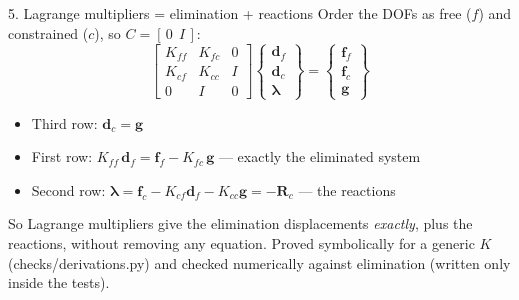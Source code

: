 \documentclass[aspectratio=169,10pt]{beamer}
\newcommand{\vd}{\mathbf d}
\newcommand{\vf}{\mathbf f}
\newcommand{\vg}{\mathbf g}
\newcommand{\vR}{\mathbf R}
\newcommand{\vlam}{\bm{\lambda}}
\begin{document}
\begin{frame}{5. Lagrange multipliers = elimination + reactions}
  Order the DOFs as free ($f$) and constrained ($c$), so $C=[\,0\ \ I\,]$:
  \[
    \begin{bmatrix}K_{ff}&K_{fc}&0\\ K_{cf}&K_{cc}&I\\ 0&I&0\end{bmatrix}
    \begin{Bmatrix}\vd_f\\ \vd_c\\ \vlam\end{Bmatrix}
    =\begin{Bmatrix}\vf_f\\ \vf_c\\ \vg\end{Bmatrix}
  \]
  \begin{itemize}
    \item Third row: $\vd_c=\vg$
    \item First row: $\boxed{K_{ff}\,\vd_f=\vf_f-K_{fc}\,\vg}$ --- exactly the eliminated system
    \item Second row: $\vlam=\vf_c-K_{cf}\vd_f-K_{cc}\vg=-\vR_c$ --- the reactions
  \end{itemize}
  \begin{block}{So}
    Lagrange multipliers give the elimination displacements \emph{exactly}, plus the reactions, without
    removing any equation. Proved symbolically for a generic $K$ (checks/derivations.py) and checked
    numerically against elimination (written only inside the tests).
  \end{block}
\end{frame}
\end{document}
